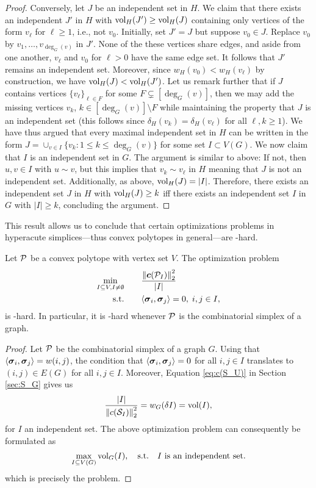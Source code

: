 \begin{proof}
	Conversely, let $J$ be an independent set in $H$. We claim that there exists an independent $J'$ in $H$ with $\vol_H(J')\geq \vol_H(J)$ containing only vertices of the form $v_\ell$ for $\ell\geq 1$, i.e., not $v_0$. Initially, set $J'=J$ but suppose $v_0\in J$. Replace $v_0$ by $v_1,\dots,v_{\deg_G(v)}$ in $J'$.  None of the these vertices share edges, and aside from one another, $v_\ell$ and $v_0$ for $\ell>0$ have the same edge set. It follows that $J'$ remains an independent set. Moreover, since $w_H(v_0) < w_H(v_\ell)$ by construction, we have $\vol_H(J)< \vol_H(J')$. Let us remark further that if $J$ contains vertices $\{v_\ell\}_{\ell\in F}$ for some $F\subsetneq  [\deg_G(v)]$, then we may add the missing vertices $v_k$, $k\in [\deg_G(v)]\setminus F$ while maintaining the property that $J$ is an independent set (this follows since $\delta_H(v_k) = \delta_H(v_\ell)$ for all  $\ell,k\geq1$). We have thus argued that every maximal independent set in $H$ can be written in the form $J= \cup_{v\in I}\{v_k: 1\leq k\leq \deg_G(v)\}$ for some set $I\subset V(G)$. We now claim that $I$ is an independent set in $G$. The argument is similar to above: If not, then $u,v\in I$ with $u\sim v$, but this implies that $v_k\sim v_\ell$ in $H$ meaning that $J$ is not an independent set.  Additionally, as above, $\vol_H(J)=|I|$. Therefore, there exists an independent set $J$ in $H$ with $\vol_H(J)\geq k$ iff there exists an independent set $I$ in $G$ with $|I|\geq k$, concluding the argument. 
\end{proof}

This result allows us to conclude that certain optimizations problems in hyperacute simplices---thus convex polytopes in general---are \NP-hard. 

\begin{lemma}
	Let $\P$ be a convex polytope with vertex set $V$. The optimization problem 
	\begin{alignat*}{2}
	\min_{I\subset V, I\neq\emptyset} & \quad &&  \frac{\norm{\cent(\P_I)}_2^2}{|I|} \\
	\text{s.t.}&  &&  \la \sv_i,\sv_j\ra=0,\; i,j\in I,
	\end{alignat*}
	is \NP-hard. In particular, it is \NP-hard whenever $\P$ is the combinatorial simplex of a graph. 
\end{lemma}
\begin{proof}
	Let $\P$ be the combinatorial simplex of a graph $G$. Using that $\la \sv_i,\sv_j\ra = w(i,j)$, the condition that $\la \sv_i,\sv_j\ra =0$ for all $i,j\in I$ translates to $(i,j)\in E(G)$ for all $i,j\in I$. Moreover, Equation \eqref{eq:c(S_U)} in Section \ref{sec:S_G} gives us  
	\begin{align*}
	\frac{|I|}{\norm{c(\splx_I)}_2^2} = w_G(\delta I) = \vol(I),
	\end{align*}
	for $I$ an independent set. 
	The above optimization problem can consequently be formulated as 
	\[\max_{I\subset V(G)} \vol_G(I),\quad  \text{s.t.} \quad I \text{ is an independent set}.\]
	which is precisely the \vwis problem. 
	\end{proof}
	
